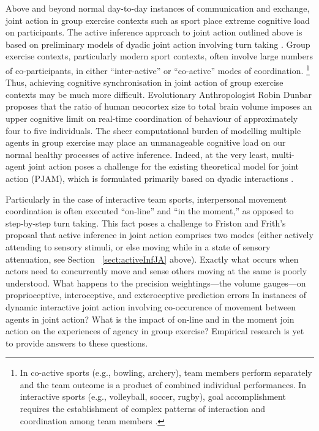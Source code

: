 \begin{CJK}{UTF8}{gbsn}
Above and beyond normal day-to-day instances of communication and exchange, joint action in group exercise contexts such as sport place extreme cognitive load on participants. The active inference approach to joint action outlined above is based on preliminary models of dyadic joint action involving turn taking \citep[i.e., in bird song exchanges][]{Friston2015}.  Group exercise contexts, particularly modern sport contexts, often involve large numbers of co-participants, in either ``inter-active'' or ``co-active'' modes of coordination.
    \footnote{
    In co-active sports (e.g., bowling, archery), team members perform separately and the team outcome is a product of combined individual performances. In interactive sports (e.g., volleyball, soccer, rugby), goal accomplishment requires the establishment of complex patterns of interaction and coordination among team members \citep{Filho2014}.
    }
Thus, achieving cognitive synchronisation in joint action of group exercise contexts may be much more difficult.  Evolutionary Anthropologist Robin Dunbar \textcite{Dunbar1992} proposes that the ratio of human neocortex size to total brain volume imposes an upper cognitive limit on real-time coordination of behaviour of approximately four to five individuals.  The sheer computational burden of modelling multiple agents in group exercise may place an unmanageable cognitive load on our normal healthy processes of active inference.  Indeed, at the very least, multi-agent joint action poses a challenge for the existing theoretical model for joint action (PJAM), which is formulated primarily based on dyadic interactions \citep{Pesquita2017}.

Particularly in the case of interactive team sports, interpersonal movement coordination is often executed ``on-line'' and ``in the moment,'' as opposed to step-by-step turn taking.  This fact poses a challenge to Friston and Frith's proposal that active inference in joint action comprises two modes (either actively attending to sensory stimuli, or else moving while in a state of sensory attenuation, see Section ~\ref{sect:activeInfJA} above).  Exactly what occurs when actors need to concurrently move and sense others moving at the same is poorly understood.  What happens to the precision weightings---the volume gauges---on proprioceptive, interoceptive, and exteroceptive prediction errors In instances of dynamic interactive joint action involving co-occurence of movement between agents in joint action?   What is the impact of on-line and in the moment join action on the experiences of agency in group exercise?  Empirical research is yet to provide answers to these questions.


\end{CJK}
